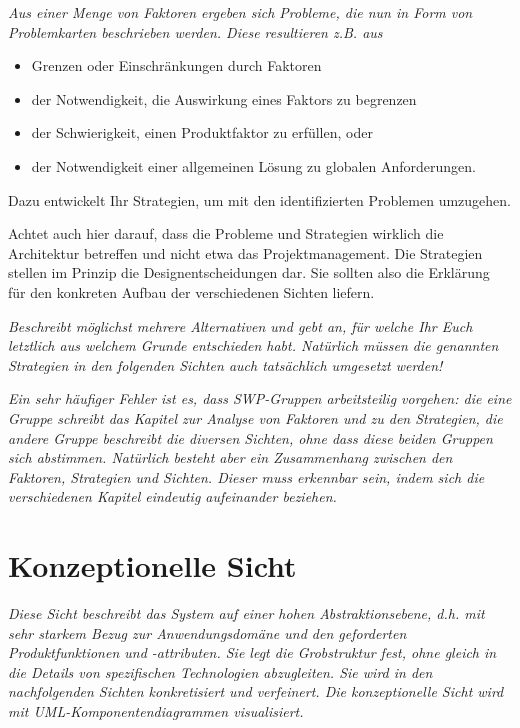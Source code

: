 \documentclass[fontsize=12pt,paper=a4,twoside]{scrartcl}
\begin{document}
{\it Aus einer Menge von Faktoren ergeben sich Probleme, die nun in
  Form von Problemkarten beschrieben werden. Diese resultieren
  z.B. aus
  \begin{itemize}
  \item Grenzen oder Einschränkungen durch Faktoren
  \item der Notwendigkeit, die Auswirkung eines Faktors zu begrenzen
  \item der Schwierigkeit, einen Produktfaktor zu erfüllen, oder
  \item der Notwendigkeit einer allgemeinen Lösung zu globalen
    Anforderungen.
  \end{itemize}
  Dazu entwickelt Ihr Strategien, um mit den identifizierten Problemen
  umzugehen.

  Achtet auch hier darauf, dass die Probleme und Strategien wirklich
  die Architektur betreffen und nicht etwa das Projektmanagement. Die
  Strategien stellen im Prinzip die Designentscheidungen dar. Sie
  sollten also die Erklärung für den konkreten Aufbau der
  verschiedenen Sichten liefern.}


\textit{Beschreibt möglichst mehrere Alternativen und gebt
  an, für welche Ihr Euch letztlich aus welchem Grunde entschieden
  habt. Natürlich müssen die genannten Strategien in den folgenden
  Sichten auch tatsächlich umgesetzt werden!}

\textit{Ein sehr häufiger Fehler ist es, dass SWP-Gruppen
  arbeitsteilig vorgehen: die eine Gruppe schreibt das Kapitel zur
  Analyse von Faktoren und zu den Strategien, die andere Gruppe
  beschreibt die diversen Sichten, ohne dass diese beiden Gruppen sich
  abstimmen. Natürlich besteht aber ein Zusammenhang zwischen den
  Faktoren, Strategien und Sichten. Dieser muss erkennbar sein, indem
  sich die verschiedenen Kapitel eindeutig aufeinander beziehen.}

\section{Konzeptionelle Sicht}
\label{sec:konzeptionell}

{\it Diese Sicht beschreibt das System auf einer hohen Abstraktionsebene,
d.h. mit sehr starkem Bezug zur Anwendungsdomäne und den geforderten
Produktfunktionen und -attributen. Sie legt die Grobstruktur fest,
ohne gleich in die Details von spezifischen Technologien abzugleiten. 
Sie wird in den nachfolgenden Sichten konkretisiert und verfeinert. Die
konzeptionelle Sicht wird mit {UML}-Komponentendiagrammen visualisiert.}
\end{document}
